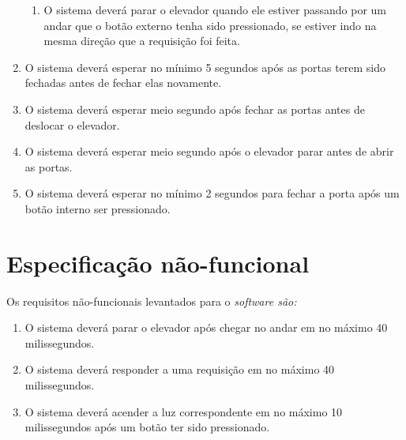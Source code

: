 \begin{enumerate}[label=RF \arabic*. , ref=\arabic*]
\begin{enumerate}[label*=\arabic*.]
    \item O sistema deverá parar o elevador quando ele estiver passando por um andar que o botão externo tenha sido pressionado, se estiver indo na mesma direção que a requisição foi feita.
    \end{enumerate}
  \item O sistema deverá esperar no mínimo 5 segundos após as portas terem sido fechadas antes de fechar elas novamente.
  \item O sistema deverá esperar meio segundo após fechar as portas antes de deslocar o elevador.
  \item O sistema deverá esperar meio segundo após o elevador parar antes de abrir as portas.
  \item O sistema deverá esperar no mínimo 2 segundos para fechar a porta após um botão interno ser pressionado.
\end{enumerate}

\section{Especificação não-funcional}

Os requisitos não-funcionais levantados para o \it{software} são:

\begin{enumerate}[label=RNF \arabic*. , ref=\arabic*]
	\item O sistema deverá parar o elevador após chegar no andar em no máximo 40 milissegundos.
  \item O sistema deverá responder a uma requisição em no máximo 40 milissegundos.
  \item O sistema deverá acender a luz correspondente em no máximo 10 milissegundos após um botão ter sido pressionado.
\end{enumerate}








